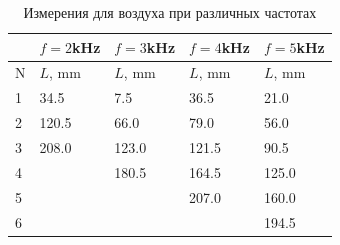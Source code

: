 \documentclass[12pt]{article}
\begin{document}
\begin{table}[H]
	\centering
	\caption{Измерения для воздуха при различных частотах}
	\begin{tabular}{|l|l|l|l|l|}
		\hline
		& $f = 2$kHz & $f = 3$kHz & $f = 4$kHz & $f = 5$kHz \\ \hline
		N & $L$, mm    & $L$, mm    & $L$, mm    & $L$, mm    \\ \hline
		1 & 34.5       & 7.5        & 36.5       & 21.0       \\ \hline
		2 & 120.5      & 66.0       & 79.0       & 56.0       \\ \hline
		3 & 208.0      & 123.0      & 121.5      & 90.5       \\ \hline
		4 &            & 180.5      & 164.5      & 125.0      \\ \hline
		5 &            &            & 207.0      & 160.0      \\ \hline
		6 &            &            &            & 194.5      \\ \hline
	\end{tabular}
\end{table}
\end{document}
